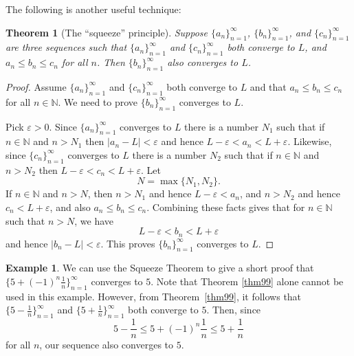 \documentclass[12pt]{amsart}
\def\e{\varepsilon}
\newcommand{\N}{\mathbb{N}}
\numberwithin{equation}{section}
\theoremstyle{plain} %
\newtheorem{thm}[equation]{Theorem}
\newtheorem{cor}[equation]{Corollary}
\theoremstyle{definition}
\newtheorem{ex}[equation]{Example}
\theoremstyle{remark}
\begin{document}
The following is another useful technique:

\begin{thm}[The ``squeeze'' principle] \label{thm33}
Suppose 
$\{a_n\}_{n=1}^\infty$, $\{b_n\}_{n=1}^\infty$, and $\{c_n\}_{n=1}^\infty$ are three sequences such that 
$\{a_n\}_{n=1}^\infty$ and $\{c_n\}_{n=1}^\infty$ both converge to $L$, 
 and $a_n \leq b_n \leq c_n$ for all $n$.
Then $\{b_n\}_{n=1}^\infty$ also converges to $L$.
\end{thm}

 

\begin{proof}
Assume $\{a_n\}_{n=1}^\infty$ and  $\{c_n\}_{n=1}^\infty$ both
converge to $L$ and that  $a_n \leq b_n \leq c_n$ for all $n \in \N$. 
We need to prove $\{b_n\}_{n=1}^\infty$ converges to $L$.

Pick $\e> 0$.  Since  $\{a_n\}_{n=1}^\infty$ converges to $L$ there is a number $N_1$ such that if $n \in \N$ and $n > N_1$ then
$|a_n - L| < \e$ and hence $L- \e < a_n < L + \e$. Likewise, 
since $\{c_n\}_{n=1}^\infty$ converges to $L$ there is a number $N_2$ such that if $n \in \N$ and $n > N_2$ then
 $L- \e < c_n < L + \e$. Let 
$$
N = \max\{N_1, N_2\}.
$$
 If $n \in \N$ and $n > N$, then
$n > N_1$ and hence $L - \e < a_n$, and $n > N_2$ and hence $c_n < L + \e$, and also
$a_n \leq  b_n \leq  c_n$. Combining these facts gives that for $n \in \N$ such that $n > N$,
we have
$$
L - \e < b_n < L + \e
$$
and hence $|b_n - L| < \e$.
This proves $\{b_n\}_{n=1}^\infty$ converges to $L$. 
\end{proof}


\begin{ex} We can use the Squeeze Theorem to give a short proof that $\{ 5 + (-1)^n \frac{1}{n} \}_{n=1}^\infty$ converges to $5$. Note that Theorem \ref{thm99} alone cannot be used in this
  example. However, from Theorem~\ref{thm99}, it follows that $\{5-\frac{1}{n}\}_{n=1}^\infty$ and  $\{5+\frac{1}{n}\}_{n=1}^\infty$ both converge to $5$. Then, since \[5-\frac{1}{n} \leq  5 + (-1)^n \frac{1}{n} \leq 5+\frac{1}{n}\] for all $n$, our sequence also converges to $5$.\end{ex}







\end{document}
